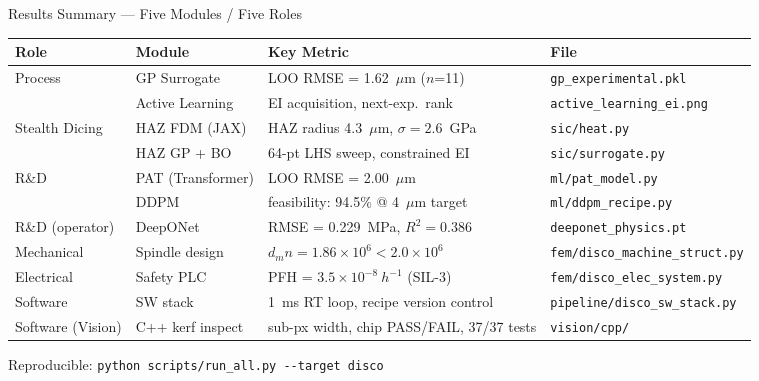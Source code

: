\documentclass[aspectratio=169,11pt]{beamer}
\begin{document}
\begin{frame}[shrink=10]{Results Summary --- Five Modules / Five Roles}
  \centering
  \renewcommand{\arraystretch}{1.3}
  \small
  \begin{tabular}{llll}
    \toprule
    \textbf{Role} & \textbf{Module} & \textbf{Key Metric} & \textbf{File} \\
    \midrule
    \multirow{2}{*}{Process}
      & GP Surrogate   & LOO RMSE = 1.62~$\mu$m ($n$=11)
                        & \texttt{gp\_experimental.pkl} \\
      & Active Learning& EI acquisition, next-exp.\ rank
                        & \texttt{active\_learning\_ei.png} \\
    \cmidrule(l){1-4}
    \multirow{2}{*}{Stealth Dicing}
      & HAZ FDM (JAX)  & HAZ radius 4.3~$\mu$m, $\sigma=2.6$~GPa
                        & \texttt{sic/heat.py} \\
      & HAZ GP + BO    & 64-pt LHS sweep, constrained EI
                        & \texttt{sic/surrogate.py} \\
    \midrule
    \multirow{2}{*}{R\&D}
      & PAT (Transformer) & LOO RMSE = 2.00~$\mu$m
                           & \texttt{ml/pat\_model.py} \\
      & DDPM              & feasibility: 94.5\% @ 4~$\mu$m target
                           & \texttt{ml/ddpm\_recipe.py} \\
    \midrule
    R\&D (operator)
      & DeepONet & RMSE = 0.229~MPa, $R^2 = 0.386$
                  & \texttt{deeponet\_physics.pt} \\
    \midrule
    Mechanical
      & Spindle design & $d_m n = 1.86\times10^6 < 2.0\times10^6$
                        & \texttt{fem/disco\_machine\_struct.py} \\
    \midrule
    Electrical
      & Safety PLC & PFH = $3.5\times10^{-8}~h^{-1}$ (SIL-3)
                    & \texttt{fem/disco\_elec\_system.py} \\
    \midrule
    Software
      & SW stack & 1~ms RT loop, recipe version control
                  & \texttt{pipeline/disco\_sw\_stack.py} \\
    \cmidrule(l){1-4}
    Software (Vision)
      & C++ kerf inspect & sub-px width, chip PASS/FAIL, 37/37 tests
                  & \texttt{vision/cpp/} \\
    \bottomrule
  \end{tabular}

  \vspace{0.4em}
  \small
  Reproducible: \texttt{python scripts/run\_all.py -{}-target disco}
\end{frame}
\end{document}
